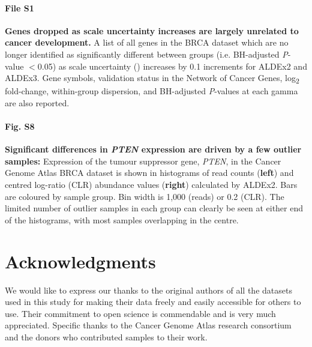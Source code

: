 \documentclass[10pt,letterpaper]{article}
\begin{document}
\paragraph*{File S1}
\label{file:supFileDroppedGenes}
\textbf{Genes dropped as scale uncertainty increases are largely unrelated to cancer development.} A list of all genes in the BRCA dataset which are no longer identified as significantly different between groups (i.e. BH-adjusted \textit{P}-value $<$0.05) as scale uncertainty (\textgamma) increases by 0.1 increments for ALDEx2 and ALDEx3. Gene symbols, validation status in the Network of Cancer Genes, log\textsubscript{2} fold-change, within-group dispersion, and BH-adjusted \textit{P}-values at each gamma are also reported.

\paragraph*{Fig. S8}
\label{fig:supFigPTEN}
\textbf{Significant differences in \textit{PTEN} expression are driven by a few outlier samples:} Expression of the tumour suppressor gene, \textit{PTEN}, in the Cancer Genome Atlas BRCA dataset is shown in histograms of read counts (\textbf{left}) and centred log-ratio (CLR) abundance values (\textbf{right}) calculated by ALDEx2. Bars are coloured by sample group. Bin width is 1,000 (reads) or 0.2 (CLR). The limited number of outlier samples in each group can clearly be seen at either end of the histograms, with most samples overlapping in the centre.



\section*{Acknowledgments}
We would like to express our thanks to the original authors of all the datasets used in this study for making their data freely and easily accessible for others to use. Their commitment to open science is commendable and is very much appreciated. Specific thanks to the Cancer Genome Atlas research consortium and the donors who contributed samples to their work.

\nolinenumbers

%
%


\end{document}
